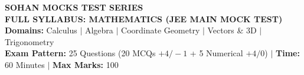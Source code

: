 \documentclass[11pt,a4paper]{article}
\begin{document}
\begin{tcolorbox}[dayheader]
\begin{center}
  {\Large \textbf{\textsf{\textcolor{goldAccent}{SOHAN MOCKS TEST SERIES}}}}\\[3pt]
  {\LARGE \textbf{\textsf{FULL SYLLABUS: MATHEMATICS (JEE MAIN MOCK TEST)}}}\\[5pt]
  {\normalsize \textbf{\textsf{Domains:}} Calculus $\vert$ Algebra $\vert$ Coordinate Geometry $\vert$ Vectors \& 3D $\vert$ Trigonometry}\\[3pt]
  {\footnotesize \textbf{Exam Pattern:} 25 Questions (20 MCQs $+4/-1$ + 5 Numerical $+4/0$) \quad $\vert$ \quad \textbf{Time:} 60 Minutes \quad $\vert$ \quad \textbf{Max Marks:} 100}
\end{center}
\end{tcolorbox}
\vspace{6pt}
\end{document}
